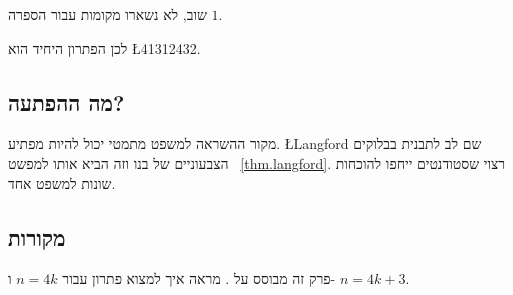 \noindent
שוב, לא נשארו מקומות עבור הספרה $1$.

\medskip

\noindent 
לכן הפתרון היחיד הוא
\L{41312432}.

\subsection*{מה ההפתעה?}

מקור ההשראה למשפט מתמטי יכול להיות מפתיע.
\L{Langford}
שם לב לתבנית בבלוקים הצבעוניים של בנו וזה הביא אותו למפשט%
~\ref{thm.langford}.
רצוי שסטודנטים ייחפו להוכחות שונות למשפט אחד.

\subsection*{מקורות}
פרק זה מבוסס על
\cite{miller}.
\cite{davies}
מראה איך למצוא פתרון עבור
$n=4k$
ו-%
$n=4k+3$.
